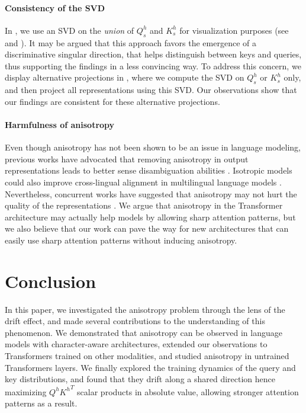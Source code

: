 \paragraph{Consistency of the SVD} In , we use an SVD on the \textit{union} of $Q^h_s$ and $K^h_s$ for visualization purposes (see  and ). It may be argued that this approach favors the emergence of a discriminative singular direction, that helps distinguish between keys and queries, thus supporting the findings in a less convincing way. To address this concern, we display alternative projections in , where we compute the SVD on $Q^h_s$ or $K^h_s$ only, and then project all representations using this SVD. Our observations show that our findings are consistent for these alternative projections.

\paragraph{Harmfulness of anisotropy} Even though anisotropy has not been shown to be an issue in language modeling, previous works have advocated that removing anisotropy in output representations leads to better sense disambiguation abilities \citep{bihani-rayz-2021-low, bis-etal-2021-much}. Isotropic models could also improve cross-lingual alignment in multilingual language models \citep{hämmerl2023exploring}. Nevertheless, concurrent works have suggested that anisotropy may not hurt the quality of the representations \citep{ait-saada-nadif-2023-anisotropy, rudman2023stable}. We argue that anisotropy in the Transformer architecture may actually help models by allowing sharp attention patterns, but we also believe that our work can pave the way for new architectures that can easily use sharp attention patterns without inducing anisotropy. 


\section*{Conclusion}
In this paper, we investigated the anisotropy problem through the lens of the drift effect, and made several contributions to the understanding of this phenomenon. We demonstrated that anisotropy can be observed in language models with character-aware architectures, extended our observations to Transformers trained on other modalities, and studied anisotropy in untrained Transformers layers. We finally explored the training dynamics of the query and key distributions, and found that they drift along a shared direction hence maximizing $Q^h{K^h}^T$ scalar products in absolute value, allowing stronger attention patterns as a result.

